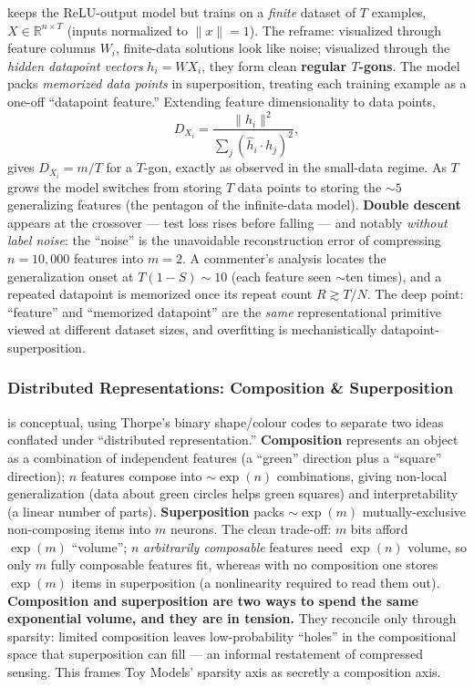 \textcite{superposition-memorization-double-descent} keeps the ReLU-output model but trains on a \emph{finite} dataset of $T$ examples, $X \in \mathbb{R}^{n\times T}$ (inputs normalized to $\lVert x\rVert=1$). The reframe: visualized through feature columns $W_i$, finite-data solutions look like noise; visualized through the \emph{hidden datapoint vectors} $h_i = WX_i$, they form clean \textbf{regular $T$-gons}. The model packs \emph{memorized data points} in superposition, treating each training example as a one-off ``datapoint feature.'' Extending feature dimensionality to data points,
\[
  D_{X_i} = \frac{\lVert h_i\rVert^2}{\sum_j (\hat h_i \cdot h_j)^2},
\]
gives $D_{X_i} = m/T$ for a $T$-gon, exactly as observed in the small-data regime. As $T$ grows the model switches from storing $T$ data points to storing the $\sim 5$ generalizing features (the pentagon of the infinite-data model). \textbf{Double descent} appears at the crossover --- test loss rises before falling --- and notably \emph{without label noise}: the ``noise'' is the unavoidable reconstruction error of compressing $n=10{,}000$ features into $m=2$. A commenter's analysis locates the generalization onset at $T(1-S)\sim 10$ (each feature seen $\sim$ten times), and a repeated datapoint is memorized once its repeat count $R \gtrsim T/N$. The deep point: ``feature'' and ``memorized datapoint'' are the \emph{same} representational primitive viewed at different dataset sizes, and overfitting is mechanistically datapoint-superposition.

\subsubsection*{Distributed Representations: Composition \& Superposition}

\textcite{distributed-representations-composition-superposition} is conceptual, using Thorpe's binary shape/colour codes to separate two ideas conflated under ``distributed representation.'' \textbf{Composition} represents an object as a combination of independent features (a ``green'' direction plus a ``square'' direction); $n$ features compose into $\sim\exp(n)$ combinations, giving non-local generalization (data about green circles helps green squares) and interpretability (a linear number of parts). \textbf{Superposition} packs $\sim\exp(m)$ mutually-exclusive non-composing items into $m$ neurons. The clean trade-off: $m$ bits afford $\exp(m)$ ``volume''; $n$ \emph{arbitrarily composable} features need $\exp(n)$ volume, so only $m$ fully composable features fit, whereas with no composition one stores $\exp(m)$ items in superposition (a nonlinearity required to read them out). \textbf{Composition and superposition are two ways to spend the same exponential volume, and they are in tension.} They reconcile only through sparsity: limited composition leaves low-probability ``holes'' in the compositional space that superposition can fill --- an informal restatement of compressed sensing. This frames Toy Models' sparsity axis as secretly a composition axis.


